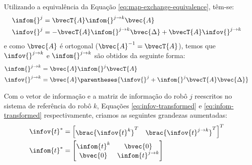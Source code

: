 Utilizando a equivalência da Equação \ref{eq:map-exchange-equivalence}, 
têm-se:
\begin{align}
  \infom{}^j &= \bvecT{A} \infom{}^{j\to k} \bvec{A}\\
  \infov{}^j &= -\bvecT{A}\infom{}^{j\to k}\bvec{\Delta} + \bvecT{A}\infov{}^{j\to k}
\end{align}
e como $\bvec{A}$ é ortogonal ($\bvec{A}^{-1} = \bvecT{A}$), temos que 
$\infov{}^{j\to k}$ e $\infom{}^{j\to k}$ são obtidos da seguinte forma:
\begin{align}
  \infom{}^{j\to k} &= \bvec{A}\infom{}^j \bvecT{A}
  \label{eq:infom-transformed}\\
  \infov{}^{j\to k} &= \bvec{A} \parentheses{\infov{}^j +  
  \infom{}^j\bvecT{A}\bvec{\Delta}}
  \label{eq:infov-transformed}
\end{align}

Com o vetor de informação e a matriz de informação do 
robô $j$ reescritos no sistema de referência do robô $k$, Equações \ref{eq:infov-transformed} e \ref{eq:infom-transformed} respectivamente, criamos as seguintes grandezas aumentadas:
\begin{align}
  \infov{t}^* &= \begin{bmatrix}
    \brac{\infov{t}^k}^T & \brac{\infov{t}^{j\to k}}^T
  \end{bmatrix}^T\\
  \infom{t}^* &= \begin{bmatrix}
    \infom{t}^k & \bvec{0}\\
    \bvec{0} & \infom{t}^{j\to k}
  \end{bmatrix} 
\end{align}

